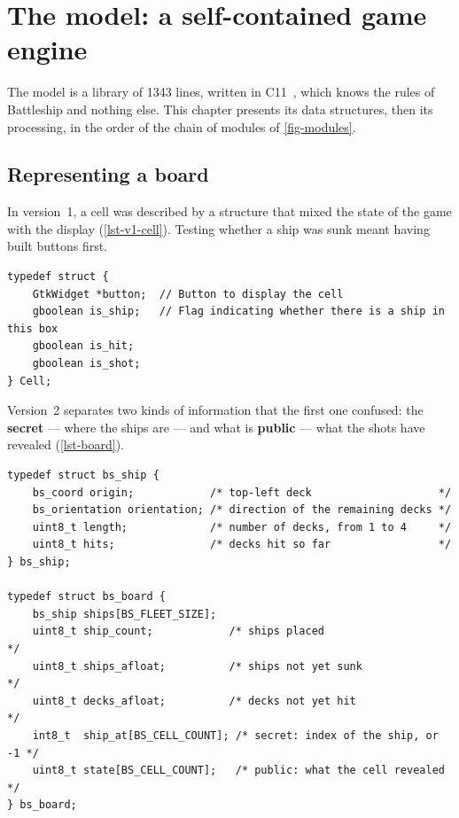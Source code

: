 \chapter{The model: a self-contained game engine}
\label{chap-modele}

The model is a library of \num{1343} lines, written in C11~\cite{iso9899}, which knows the
rules of Battleship and nothing else. This chapter presents its data structures, then its
processing, in the order of the chain of modules of \cref{fig-modules}.

\section{Representing a board}

In version~1, a cell was described by a structure that mixed the state of the game with the
display (\cref{lst-v1-cell}). Testing whether a ship was sunk meant having built buttons
first.

\begin{lstlisting}[caption={Version~1: the cell knows its button.}, label={lst-v1-cell}]
typedef struct {
    GtkWidget *button;  // Button to display the cell
    gboolean is_ship;   // Flag indicating whether there is a ship in this box
    gboolean is_hit;
    gboolean is_shot;
} Cell;
\end{lstlisting}

Version~2 separates two kinds of information that the first one confused: the
\textbf{secret} --- where the ships are --- and what is \textbf{public} --- what the shots
have revealed (\cref{lst-board}).

\begin{lstlisting}[caption={One side's board (\fichier{include/battleship/board.h}).},
                   label={lst-board}]
typedef struct bs_ship {
    bs_coord origin;            /* top-left deck                    */
    bs_orientation orientation; /* direction of the remaining decks */
    uint8_t length;             /* number of decks, from 1 to 4     */
    uint8_t hits;               /* decks hit so far                 */
} bs_ship;

typedef struct bs_board {
    bs_ship ships[BS_FLEET_SIZE];
    uint8_t ship_count;            /* ships placed                      */
    uint8_t ships_afloat;          /* ships not yet sunk                */
    uint8_t decks_afloat;          /* decks not yet hit                 */
    int8_t  ship_at[BS_CELL_COUNT]; /* secret: index of the ship, or -1 */
    uint8_t state[BS_CELL_COUNT];   /* public: what the cell revealed   */
} bs_board;
\end{lstlisting}

